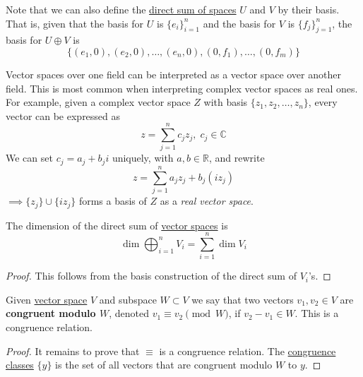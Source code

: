   \begin{example}
    \label{ex:vector-space-as-direct-sum-of-basis}
    Note that we can also define the \hyperref[def:direct-sum-of-spaces]{direct sum of spaces} $U$ and $V$ by their basis. That is, given that the basis for $U$ is $\{e_i\}_{i=1}^n$ and the basis for $V$ is $\{f_j\}_{j=1}^n$, the basis for $U \oplus V$ is
    \begin{equation}
      \{(e_1, 0), (e_2, 0), \ldots, (e_n, 0), (0, f_1), \ldots, (0, f_m)\}
    \end{equation}
  \end{example}

  \begin{example}
    \label{ex:complex-vector-spaces-as-real-vector-spaces}
    Vector spaces over one field can be interpreted as a vector space over another field. This is most common when interpreting complex vector spaces as real ones. For example, given a complex vector space $Z$ with basis $\{z_1, z_2, \ldots, z_n\}$, every vector can be expressed as
    \begin{equation}
      z = \sum_{j=1}^n c_j z_j, \; c_j \in \mathbb{C}
    \end{equation}
    We can set $c_j = a_j + b_j i$ uniquely, with $a, b \in \mathbb{R}$, and rewrite
    \begin{equation}
      z = \sum_{j=1}^n a_j z_j + b_j (i z_j)
    \end{equation}
    $\implies \{ z_j\} \cup \{ i z_j\}$ forms a basis of $Z$ as a \textit{real vector space}. 
  \end{example}

  \begin{theorem}
    \label{thm:dimension-of-direct-sum}
    The dimension of the direct sum of \hyperref[def:vector-space]{vector spaces} is 
    \begin{equation}
      \dim{\bigoplus_{i=1}^n V_i} = \sum_{i=1}^n \dim{V_i}
    \end{equation}
  \end{theorem}
  \begin{proof}
    This follows from the basis construction of the direct sum of $V_i$'s. 
  \end{proof}

  \begin{definition}
    \label{def:congruence-relations-on-vector-spaces}
    Given \hyperref[def:vector-space]{vector space} $V$ and subspace $W \subset V$ we say that two vectors $v_1, v_2 \in V$ are \textbf{congruent modulo $W$}, denoted $v_1 \equiv v_2 \pmod{W}$, if $v_2 - v_1 \in W$. This is a congruence relation. 
  \end{definition}
  \begin{proof}
    It remains to prove that $\equiv$ is a congruence relation. The \hyperref[dg-def:congruence-classes]{congruence classes} $\{ y\}$ is the set of all vectors that are congruent modulo $W$ to $y$. 
  \end{proof}

